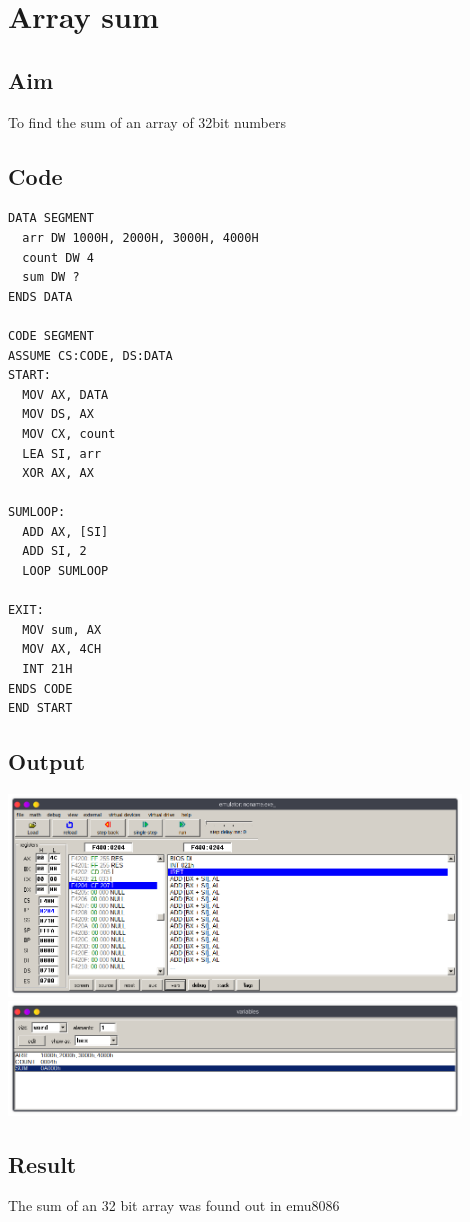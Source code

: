 \section{Array sum}
\subsection{Aim}
To find the sum of an array of 32bit numbers

\subsection{Code}
\begin{lstlisting}
DATA SEGMENT
  arr DW 1000H, 2000H, 3000H, 4000H
  count DW 4
  sum DW ?
ENDS DATA

CODE SEGMENT
ASSUME CS:CODE, DS:DATA
START:
  MOV AX, DATA
  MOV DS, AX
  MOV CX, count
  LEA SI, arr
  XOR AX, AX

SUMLOOP:
  ADD AX, [SI]
  ADD SI, 2
  LOOP SUMLOOP

EXIT:
  MOV sum, AX
  MOV AX, 4CH
  INT 21H
ENDS CODE
END START
\end{lstlisting}

\subsection{Output}
\begin{center}
	\includegraphics[width=0.90\textwidth]{img/p7/ss1.png}
	\includegraphics[width=0.90\textwidth]{img/p7/ss2.png}
\end{center}

\subsection{Result}
The sum of an 32 bit array was found out in emu8086